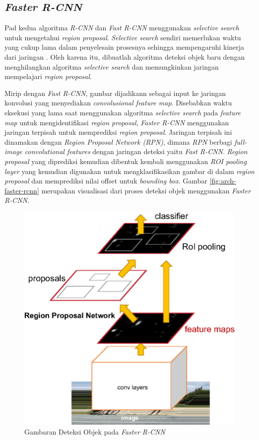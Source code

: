 \subsection{\textit{Faster R-CNN}}
\label{subsec:faster-rcnn}

Pad kedua algoritma \textit{R-CNN} dan \textit{Fast R-CNN} menggunakan \textit{selective search} untuk mengetahui \textit{region proposal}. \textit{Selective search} sendiri memerlukan waktu yang cukup lama dalam penyelesain prosesnya sehingga mempengaruhi kinerja dari jaringan \citep{faster-rcnn}. Oleh karena itu, dibuatlah algoritma deteksi objek baru dengan menghilangkan algoritma \textit{selective search} dan memungkinkan jaringan mempelajari \textit{region proposal}.

Mirip dengan \textit{Fast R-CNN}, gambar dijadikann sebagai input ke jaringan konvolusi yang menyediakan \textit{convolusional feature map}. Disebabkan waktu eksekusi yang lama saat menggunakan algoritma \textit{selective search} pada \textit{feature map} untuk mengidentifikasi \textit{region proposal}, \textit{Faster R-CNN} menggunakan jaringan terpisah untuk memprediksi \textit{region proposal}. Jaringan terpisah ini dinamakan dengan \textit{Region Proposal Network (RPN)}, dimana \textit{RPN} berbagi \textit{full-image convolutional features} dengan jaringan deteksi yaitu \textit{Fast R-CNN}. \textit{Region proposal} yang diprediksi kemudian dibentuk kembali menggunakan \textit{ROI pooling layer} yang kemudian digunakan untuk mengklasifikasikan gambar di dalam \textit{region proposal} dan memprediksi nilai offset untuk \textit{bounding box}. Gambar \ref{fig:arch-faster-rcnn} merupakan visualisasi dari proses deteksi objek menggunakan \textit{Faster R-CNN}. 

\begin{figure}[h]
	\centering
	\includegraphics[scale=0.15]{gambar/arch-faster-rcnn.png}
	\caption{Gambaran Deteksi Objek pada \textit{Faster R-CNN} \citep{arch-faster-rcnn}}
	\label{fig:faster-rcnn}
\end{figure}

